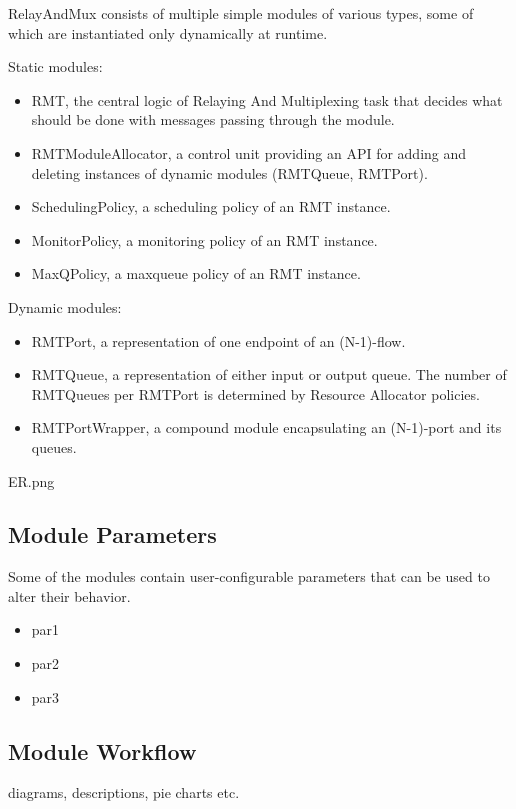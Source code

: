             RelayAndMux consists of multiple simple modules of various types, some of which are instantiated only dynamically at runtime.

            Static modules:
            \begin{itemize}
                \item RMT, the central logic of Relaying And Multiplexing task that decides what should be done with messages passing through the module.
                \item RMTModuleAllocator, a control unit providing an API for adding and deleting instances of dynamic modules (RMTQueue, RMTPort).
                \item SchedulingPolicy, a scheduling policy of an RMT instance.
                \item MonitorPolicy, a monitoring policy of an RMT instance.
                \item MaxQPolicy, a maxqueue policy of an RMT instance.
            \end{itemize}

            Dynamic modules:
            \begin{itemize}
                \item RMTPort, a representation of one endpoint of an (N-1)-flow.
                \item RMTQueue, a representation of either input or output queue. The number of RMTQueues per RMTPort is determined by Resource Allocator policies.
                \item RMTPortWrapper, a compound module encapsulating an (N-1)-port and its queues.
            \end{itemize}

            ER.png

        \subsection{Module Parameters}
            Some of the modules contain user-configurable parameters that can be used to alter their behavior. %
            \begin{itemize}
                \item par1
                \item par2
                \item par3
            \end{itemize}


        \subsection{Module Workflow}
            diagrams, descriptions, pie charts etc.

